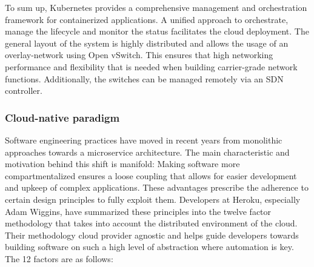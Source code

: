 To sum up, Kubernetes provides a comprehensive management and orchestration framework for containerized applications. A unified approach to orchestrate, manage the lifecycle and monitor the status facilitates the cloud deployment. The general layout of the system is highly distributed and allows the usage of an overlay-network using Open vSwitch. This ensures that high networking performance and flexibility that is needed when building carrier-grade network functions. Additionally, the switches can be managed remotely via an SDN controller. \cite{burns2016borg} \cite{kubernetesUp} \cite{k8CN}


\subsubsection{Cloud-native paradigm}
Software engineering practices have moved in recent years from monolithic approaches towards a microservice architecture. The main characteristic and motivation behind this shift is manifold: Making software more compartmentalized ensures a loose coupling that allows for easier development and upkeep of complex applications. These advantages prescribe the adherence to certain design principles to fully exploit them. 
Developers at Heroku, especially Adam Wiggins, have summarized these principles into the twelve factor methodology that takes into account the distributed environment of the cloud. Their methodology cloud provider agnostic and helps guide developers towards building software on such a high level of abstraction where automation is key. The 12 factors are as follows:

